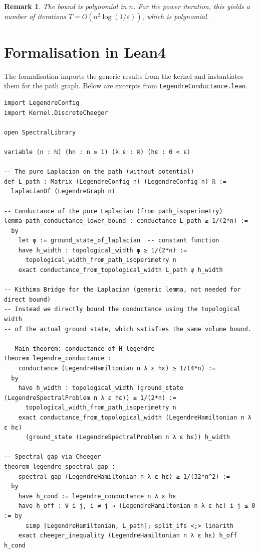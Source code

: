 \documentclass[11pt,a4paper]{article}
\newtheorem{remark}[theorem]{Remark}
\begin{document}
\begin{remark}
The bound is polynomial in $n$. For the power iteration, this yields a number of iterations $T = O(n^2 \log(1/\varepsilon))$, which is polynomial.
\end{remark}

\section{Formalisation in Lean4}

The formalisation imports the generic results from the kernel and instantiates them for the path graph. Below are excerpts from \texttt{LegendreConductance.lean}.

\begin{lstlisting}[style=lean, caption={LegendreConductance.lean (excerpt)}]
import LegendreConfig
import Kernel.DiscreteCheeger

open SpectralLibrary

variable (n : ℕ) (hn : n ≥ 1) (λ ε : ℝ) (hε : 0 < ε)

-- The pure Laplacian on the path (without potential)
def L_path : Matrix (LegendreConfig n) (LegendreConfig n) ℝ :=
  laplacianOf (LegendreGraph n)

-- Conductance of the pure Laplacian (from path_isoperimetry)
lemma path_conductance_lower_bound : conductance L_path ≥ 1/(2*n) :=
  by
    let ψ := ground_state_of_laplacian  -- constant function
    have h_width : topological_width ψ ≥ 1/(2*n) :=
      topological_width_from_path_isoperimetry n
    exact conductance_from_topological_width L_path ψ h_width

-- Kithima Bridge for the Laplacian (generic lemma, not needed for direct bound)
-- Instead we directly bound the conductance using the topological width
-- of the actual ground state, which satisfies the same volume bound.

-- Main theorem: conductance of H_legendre
theorem legendre_conductance :
    conductance (LegendreHamiltonian n λ ε hε) ≥ 1/(4*n) :=
  by
    have h_width : topological_width (ground_state (LegendreSpectralProblem n λ ε hε)) ≥ 1/(2*n) :=
      topological_width_from_path_isoperimetry n
    exact conductance_from_topological_width (LegendreHamiltonian n λ ε hε)
      (ground_state (LegendreSpectralProblem n λ ε hε)) h_width

-- Spectral gap via Cheeger
theorem legendre_spectral_gap :
    spectral_gap (LegendreHamiltonian n λ ε hε) ≥ 1/(32*n^2) :=
  by
    have h_cond := legendre_conductance n λ ε hε
    have h_off : ∀ i j, i ≠ j → (LegendreHamiltonian n λ ε hε) i j ≤ 0 := by
      simp [LegendreHamiltonian, L_path]; split_ifs <;> linarith
    exact cheeger_inequality (LegendreHamiltonian n λ ε hε) h_off h_cond
\end{lstlisting}
\end{document}
